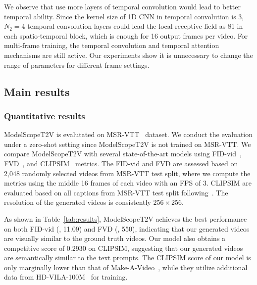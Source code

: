 We observe that use more layers of temporal convolution would lead to better temporal ability. Since the kernel size of 1D CNN in temporal convolution is 3, $N_2=4$ temporal convolution layers could lead the local receptive field as 81 in each spatio-temporal block, which is enough for 16 output frames per video. For multi-frame training, the temporal convolution and temporal attention mechanisms are still active. Our experiments show it is unnecessary to change the range of parameters for different frame settings.

\subsection{Main results}

\subsubsection{Quantitative results}
ModelScopeT2V is evalutated on MSR-VTT~\cite{xu2016msr-vtt} dataset. 
We conduct the evaluation under a zero-shot setting since ModelScopeT2V is not trained on MSR-VTT. 
We compare ModelScopeT2V with several state-of-the-art models using FID-vid~\cite{heusel2017gans_nash_equilibrium}, FVD~\cite{unterthiner2018FVD}, and CLIPSIM~\cite{wu2021godiva} metrics. 
The FID-vid and FVD are assessed based on 2,048 randomly selected videos from MSR-VTT test split, where we compute the metrics using the middle 16 frames of each video with an FPS of 3. 
CLIPSIM are evaluated based on all captions from MSR-VTT test split following~\cite{singer2022make-a-video}.
The resolution of the generated videos is consistently $256 \times 256$.

As shown in Table~\ref{tab:results}, ModelScopeT2V achieves the best performance on both FID-vid (\ie, 11.09) and FVD (\ie, 550), indicating that our generated videos are visually similar to the ground truth videos.
Our model also obtains a competitive score of 0.2930 on CLIPSIM, suggesting that our generated videos are semantically similar to the text prompts. 
The CLIPSIM score of our model is only marginally lower than that of Make-A-Video~\cite{singer2022make-a-video}, while they utilize additional data from HD-VILA-100M~\cite{xue2022HD-VILA-100M} for training. 


